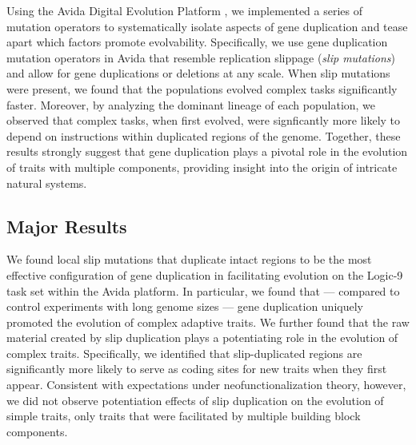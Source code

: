 Using the Avida Digital Evolution Platform \citep{ofria2004avida}, we implemented a series of mutation operators to systematically isolate aspects of gene duplication and tease apart which factors promote evolvability.
Specifically, we use gene duplication mutation operators in Avida that resemble replication slippage \citep{bzymek_instability_2001} (\textit{slip mutations}) and allow for gene duplications or deletions at any scale.
When slip mutations were present, we found that the populations evolved complex tasks significantly faster.
Moreover, by analyzing the dominant lineage of each population, we observed that complex tasks, when first evolved, were signficantly more likely to depend on instructions within duplicated regions of the genome.
Together, these results strongly suggest that gene duplication plays a pivotal role in the evolution of traits with multiple components, providing insight into the origin of intricate natural systems.

\subsection{Major Results}

We found local slip mutations that duplicate intact regions to be the most effective configuration of gene duplication in facilitating evolution on the Logic-9 task set within the Avida platform.
In particular, we found that --- compared to control experiments with long genome sizes --- gene duplication uniquely promoted the evolution of complex adaptive traits.
We further found that the raw material created by slip duplication plays a potentiating role in the evolution of complex traits.
Specifically, we identified that slip-duplicated regions are significantly more likely to serve as coding sites for new traits when they first appear.
Consistent with expectations under neofunctionalization theory, however, we did not observe potentiation effects of slip duplication on the evolution of simple traits, only traits that were facilitated by multiple building block components.

